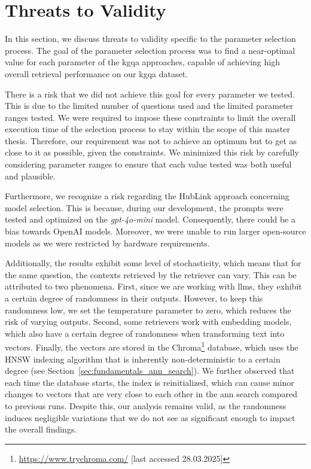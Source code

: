 
\section{Threats to Validity}
\label{sec:param_selection_threats_to_validity}


In this section, we discuss threats to validity specific to the parameter selection process. The goal of the parameter selection process was to find a near-optimal value for each parameter of the \gls{kgqa} approaches, capable of achieving high overall retrieval performance on our \gls{kgqa} dataset.

There is a risk that we did not achieve this goal for every parameter we tested. This is due to the limited number of questions used and the limited parameter ranges tested. We were required to impose these constraints to limit the overall execution time of the selection process to stay within the scope of this master thesis. Therefore, our requirement was not to achieve an optimum but to get as close to it as possible, given the constraints. We minimized this risk by carefully considering parameter ranges to ensure that each value tested was both useful and plausible.

Furthermore, we recognize a risk regarding the HubLink approach concerning model selection. This is because, during our development, the prompts were tested and optimized on the \emph{gpt-4o-mini} model. Consequently, there could be a bias towards OpenAI models. Moreover, we were unable to run larger open-source models as we were restricted by hardware requirements. 

Additionally, the results exhibit some level of stochasticity, which means that for the same question, the contexts retrieved by the retriever can vary. This can be attributed to two phenomena. First, since we are working with \glspl{llm}, they exhibit a certain degree of randomness in their outputs. However, to keep this randomness low, we set the temperature parameter to zero, which reduces the risk of varying outputs. Second, some retrievers work with embedding models, which also have a certain degree of randomness when transforming text into vectors. Finally, the vectors are stored in the Chroma\footnote{\url{https://www.trychroma.com/} [last accessed 28.03.2025]} database, which uses the HNSW \cite{malkov_efficient_2018} indexing algorithm that is inherently non-deterministic to a certain degree (see Section~\ref{sec:fundamentals_ann_search}). We further observed that each time the database starts, the index is reinitialized, which can cause minor changes to vectors that are very close to each other in the \gls{ann} search compared to previous runs. Despite this, our analysis remains valid, as the randomness induces negligible variations that we do not see as significant enough to impact the overall findings.



